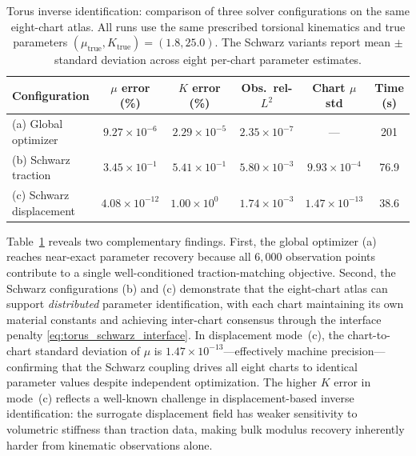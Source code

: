 \documentclass[sort&compress]{svjour3} %
\begin{document}
\begin{table}[htbp]
\centering
\scriptsize
\setlength{\tabcolsep}{3pt}
\caption{Torus inverse identification: comparison of three solver configurations on the same eight-chart atlas. All runs use the same prescribed torsional kinematics and true parameters $(\mu_{\mathrm{true}},K_{\mathrm{true}})=(1.8,25.0)$. The Schwarz variants report mean $\pm$ standard deviation across eight per-chart parameter estimates.}
\label{tab:torus_comparison}
\begin{tabular}{lccccc}
\toprule
Configuration & $\mu$ error (\%) & $K$ error (\%) & Obs.\ rel-$L^2$ & Chart $\mu$ std & Time (s) \\
\midrule
(a) Global optimizer & $9.27\times10^{-6}$ & $2.29\times10^{-5}$ & $2.35\times10^{-7}$ & --- & 201 \\
(b) Schwarz traction & $3.45\times10^{-1}$ & $5.41\times10^{-1}$ & $5.80\times10^{-3}$ & $9.93\times10^{-4}$ & 76.9 \\
(c) Schwarz displacement & $4.08\times10^{-12}$ & $1.00\times10^{0\phantom{-}}$ & $1.74\times10^{-3}$ & $1.47\times10^{-13}$ & 38.6 \\
\bottomrule
\end{tabular}
\end{table}

Table~\ref{tab:torus_comparison} reveals two complementary findings. First, the global optimizer (a) reaches near-exact parameter recovery because all $6{,}000$ observation points contribute to a single well-conditioned traction-matching objective. Second, the Schwarz configurations (b) and (c) demonstrate that the eight-chart atlas can support \emph{distributed} parameter identification, with each chart maintaining its own material constants and achieving inter-chart consensus through the interface penalty \eqref{eq:torus_schwarz_interface}. In displacement mode~(c), the chart-to-chart standard deviation of $\mu$ is $1.47\times10^{-13}$---effectively machine precision---confirming that the Schwarz coupling drives all eight charts to identical parameter values despite independent optimization. The higher $K$ error in mode~(c) reflects a well-known challenge in displacement-based inverse identification: the surrogate displacement field has weaker sensitivity to volumetric stiffness than traction data, making bulk modulus recovery inherently harder from kinematic observations alone.
\end{document}
